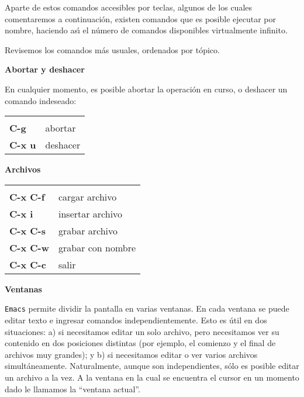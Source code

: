 Aparte de estos comandos accesibles por teclas, algunos de los cuales
 comentaremos a continuaci\'on, existen comandos que es posible ejecutar por
nombre, haciendo as\'{\i} el n\'umero de comandos disponibles
virtualmente infinito.

Revisemos los comandos m\'as usuales, ordenados por t\'opico.

\vspace{0.1cm}

\noindent
{\bf Abortar y deshacer}

En cualquier momento, es posible abortar la operaci\'on en curso, o
deshacer un comando indeseado:

\begin{center}
  \begin{tabular}{|ll|}
\hline
& \\
{\bf  C-g}  &        abortar\\
{\bf C-x u} & deshacer\\[1mm] \hline
  \end{tabular}
\end{center}


\noindent
{\bf Archivos}

\vspace{0.1cm}

\begin{center}
\begin{tabular}{|ll|}
\hline 
&  \\
{\bf C-x C-f} &    cargar archivo \\
{\bf C-x i} &     insertar archivo \\
{\bf C-x C-s}       &   grabar archivo \\
{\bf C-x C-w} &  grabar con nombre \\
{\bf C-x C-c}  & salir  \\[1mm] \hline
\end{tabular}
\end{center}


\noindent
{\bf Ventanas}

\verb+Emacs+ permite dividir la pantalla en varias ventanas. En cada
ventana se puede editar texto e ingresar comandos
independientemente. Esto es \'util en dos situaciones: a) si necesitamos
editar un solo archivo, pero necesitamos ver su contenido en dos
posiciones distintas (por ejemplo, el comienzo y el final de archivos
muy grandes); y b) si necesitamos editar o ver varios archivos
simult\'aneamente. Naturalmente, aunque son independientes, 
s\'olo es posible editar un archivo a la vez. A la ventana en la cual
se encuentra el cursor en un momento dado le llamamos la ``ventana
actual''. 

